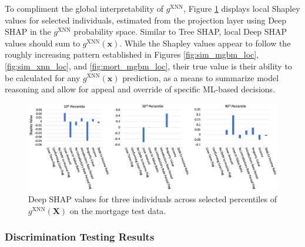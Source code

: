\documentclass[information,article,submit,moreauthors,pdftex]{definitions/mdpi}
\begin{document}
To compliment the global interpretability of $g^\text{XNN}$, Figure \ref{fig:mort_xnn_loc} displays local Shapley values for selected individuals, estimated from the projection layer using Deep SHAP in the $g^\text{XNN}$ probability space. Similar to Tree SHAP, local Deep SHAP values should sum to $g^\text{XNN}(\mathbf{x})$. While the Shapley values appear to follow the roughly increasing pattern established in Figures \ref{fig:sim_mgbm_loc}, \ref{fig:sim_xnn_loc}, and \ref{fig:mort_mgbm_loc}, their true value is their ability to be calculated for any $g^\text{XNN}(\mathbf{x})$ prediction, as a means to summarize model reasoning and allow for appeal and override of specific ML-based decisions. 

\begin{figure}[htb]
\centering
\includegraphics[width=16cm]{img/mort_xnn_loc.png}
\caption{Deep SHAP values for three individuals across selected percentiles of $g^\text{XNN}(\mathbf{X})$ on the mortgage test data.}
\label{fig:mort_xnn_loc}
\end{figure}

\subsubsection{Discrimination Testing Results}\label{ssec:dis_mort}
\end{document}
